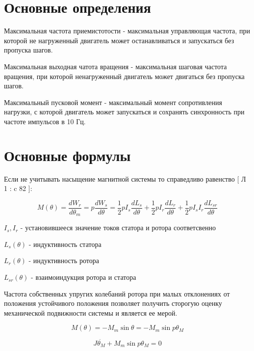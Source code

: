 \documentclass{article}
\begin{document}
\part{ Основные определения }

Максимальная частота приемистотости - максимальная управляющая частота, при которой не нагруженный
двигатель может останавливаться и запускаться без пропуска шагов.

Максимальная выходная чатота вращения - максимальная шаговая частота вращения, при которой
ненагруженный двигатель может двигаться без пропуска шагов.

Максимальный пусковой момент - максимальный момент сопротивления нагрузки, с которой двигатель может
запускаться и сохранять синхронность при частоте импульсов в 10 Гц.

\part{ Основные формулы }

Если не учитывать насыщение магнитной системы то справедливо равенство [ Л 1 : c 82 ]:

\begin{equation}
\label{step_motor_torque_common}
    M(\theta)
    = \frac{dW_r}{d\theta_m} 
    = p \frac{dW_s}{d\theta}
    = \frac{1}{2} p I_s \frac{dL_s}{d\theta}
        + \frac{1}{2} p I_r \frac{dL_r}{d\theta}
        + \frac{1}{2} p I_{s} I_r \frac{dL_{sr}}{d\theta}
\end{equation}

$I_{s}, I_{r}$ - установившееся значение токов статора и ротора соответсвенно

$L_{s}(\theta)$ - индуктивность статора

$L_{r}(\theta)$ - индуктивность ротора

$L_{sr}(\theta)$ - взаимоиндукция ротора и статора

Частота собственных упругих колебаний ротора \cite[гл 3-1]{Chilikin} при малых отклонениях от положения устойчивого
положения позволяет получить сторогую оценку механической подвижности системы и является ее мерой.

\begin{equation}
\label{step_motor_torque_without_load_and_with_unstable_rotor}
    M(\theta)
    = - M_{m} \sin{\theta}
    = - M_{m} \sin{p\theta_{M}}
\end{equation}

\begin{equation}
\label{step_motor_dynamic_move_equation}   
    J \ddot{ \theta_{M} } + M_{m} \sin{p \theta_{M}} = 0
\end{equation}
\end{document}
